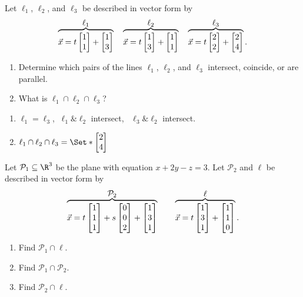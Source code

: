 \begin{exercises}
\begin{problist}
\begin{solution}
\begin{enumerate}
    		\end{enumerate}
		\end{solution}
		\prob Let $\ell_1$, $\ell_2$, and $\ell_3$ be described in vector form by
		\[
			\overbrace{\vec x=t\mat{1\\1}+\mat{1\\3}}^{\displaystyle \ell_1}
			\quad
			\overbrace{\vec x=t\mat{1\\3}+\mat{1\\1}}^{\displaystyle \ell_2}
			\quad
			\overbrace{\vec x=t\mat{2\\2}+\mat{2\\4}}^{\displaystyle \ell_3}.
		\]
		\begin{enumerate}
			\item
				Determine which pairs of the lines $\ell_1$, $\ell_2$, and $\ell_3$ intersect, 
				coincide, or are parallel.
			\item What is $\ell_1\cap\ell_2\cap\ell_3$?
		\end{enumerate}
		\begin{solution} 
		    \begin{enumerate}
		        \item $\ell_1 = \ell_3$, $\ \ell_1 \& \ell_2$ intersect, \ $\ell_3 \& \ell_2$ intersect.
		        \item $\ell_1\cap\ell_2\cap\ell_3 = \Set*{\mat{2\\4}}$
		    \end{enumerate}
		\end{solution}
		\prob Let $\mathcal P_1\subseteq\R^3$ be the plane with equation $x+2y-z=3$. Let
		$\mathcal P_2$ and $\ell$ be described in vector form by
		\[
			\overbrace{\vec x=t\mat{1\\1\\1}+s\mat{0\\0\\2}+\mat{1\\3\\1}}^{\displaystyle \mathcal P_2}
			\qquad
			\overbrace{\vec x=t\mat{1\\3\\1}+\mat{1\\1\\0}}^{\displaystyle \ell}.
		\]
		\begin{enumerate}
			\item Find $\mathcal P_1\cap \ell$.
			\item Find $\mathcal P_1\cap \mathcal P_2$.
			\item Find $\mathcal P_2\cap \ell$.

\end{enumerate}
\end{problist}
\end{exercises}
